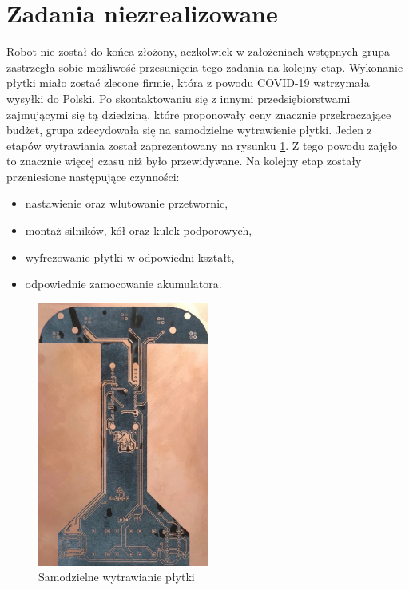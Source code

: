 \documentclass[10pt, a4paper]{article}
\begin{document}
\section{Zadania niezrealizowane}

Robot nie został do końca złożony, aczkolwiek w założeniach wstępnych grupa zastrzegła sobie możliwość przesunięcia tego zadania na kolejny etap. Wykonanie płytki miało zostać zlecone firmie, która z powodu COVID-19 wstrzymała wysyłki do Polski. Po skontaktowaniu się z innymi przedsiębiorstwami zajmującymi się tą dziedziną, które proponowały ceny znacznie przekraczające budżet, grupa zdecydowała się na samodzielne wytrawienie płytki. Jeden z etapów wytrawiania został zaprezentowany na rysunku \ref{fig:wytrawianie}. Z tego powodu zajęło to znacznie więcej czasu niż było przewidywane. Na kolejny etap zostały przeniesione następujące czynności:
\begin{itemize}
    \item nastawienie oraz wlutowanie przetwornic,
    \item montaż silników, kół oraz kulek podporowych,
    \item wyfrezowanie płytki w odpowiedni kształt,
    \item odpowiednie zamocowanie akumulatora.
    
\end{itemize}

\begin{figure}[H]
    \centering
    \includegraphics[width = 0.5\textwidth]{wytrawianie.jpg}
    \caption{Samodzielne wytrawianie płytki}
    \label{fig:wytrawianie}
\end{figure}
\end{document}
